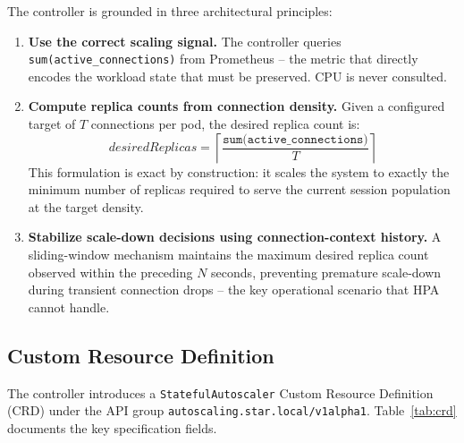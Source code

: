 \documentclass[twocolumn]{svjour3}
\begin{document}
The controller is grounded in three architectural principles:

\begin{enumerate}[leftmargin=*]
\item \textbf{Use the correct scaling signal.} The controller queries \texttt{sum(active\_connections)} from Prometheus -- the metric that directly encodes the workload state that must be preserved. CPU is never consulted.

\item \textbf{Compute replica counts from connection density.} Given a configured target of $T$ connections per pod, the desired replica count is:
\begin{equation}
\textit{desiredReplicas} = \left\lceil \frac{\texttt{sum(active\_connections)}}{T} \right\rceil
\label{eq:stateful}
\end{equation}
This formulation is exact by construction: it scales the system to exactly the minimum number of replicas required to serve the current session population at the target density.

\item \textbf{Stabilize scale-down decisions using connection-context history.} A sliding-window mechanism maintains the maximum desired replica count observed within the preceding $N$ seconds, preventing premature scale-down during transient connection drops -- the key operational scenario that HPA cannot handle.
\end{enumerate}

\subsection{Custom Resource Definition}

The controller introduces a \texttt{StatefulAutoscaler} Custom Resource Definition (CRD) under the API group \texttt{autoscaling.star.local/v1alpha1}. Table~\ref{tab:crd} documents the key specification fields.
\end{document}
